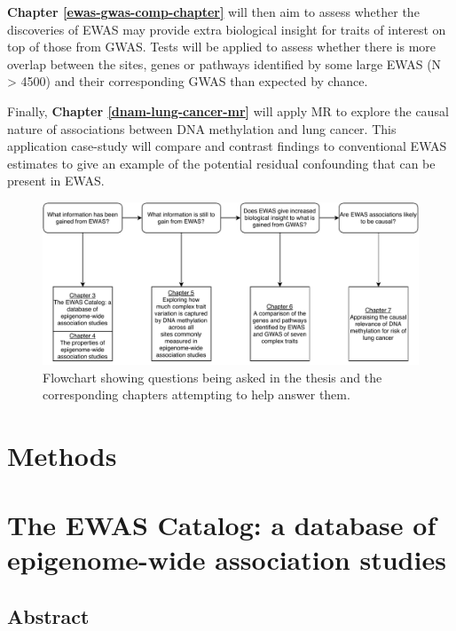 \documentclass[11pt,twoside]{bristolthesis}
\begin{document}
\textbf{Chapter \ref{ewas-gwas-comp-chapter}} will then aim to assess whether the discoveries of EWAS may provide extra biological insight for traits of interest on top of those from GWAS. Tests will be applied to assess whether there is more overlap between the sites, genes or pathways identified by some large EWAS (N \textgreater{} 4500) and their corresponding GWAS than expected by chance.

Finally, \textbf{Chapter \ref{dnam-lung-cancer-mr}} will apply MR to explore the causal nature of associations between DNA methylation and lung cancer. This application case-study will compare and contrast findings to conventional EWAS estimates to give an example of the potential residual confounding that can be present in EWAS.


\begin{figure}
\centering
\includegraphics{figure/01-introduction/thesis-flowchart.pdf}
\caption{\label{fig:thesis-flowchart}Flowchart showing questions being asked in the thesis and the corresponding chapters attempting to help answer them.}
\end{figure}
\hypertarget{methods}{%
\chapter{Methods}\label{methods}}

\hypertarget{ewas-catalog}{%
\chapter{The EWAS Catalog: a database of epigenome-wide association studies}\label{ewas-catalog}}

\hypertarget{abstract}{%
\section{Abstract}\label{abstract}}
\end{document}
